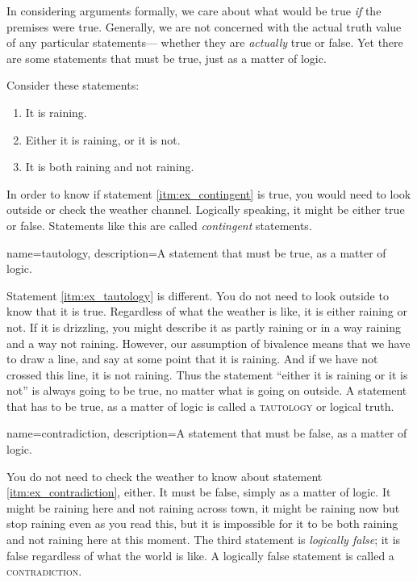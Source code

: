 In considering arguments formally, we care about what would be true \emph{if} the premises were true. Generally, we are not concerned with the actual truth value of any particular statements--- whether they are \emph{actually} true or false. Yet there are some statements that must be true, just as a matter of logic.

Consider these statements:
\begin{enumerate}[label=(\alph*)]
\item \label{itm:ex_contingent} It is raining.
\item \label{itm:ex_tautology} Either it is raining, or it is not.
\item \label{itm:ex_contradiction} It is both raining and not raining.
\end{enumerate}
In order to know if statement \ref{itm:ex_contingent} is true, you would need to look outside or check the weather channel. Logically speaking, it might be either true or false. Statements like this are called \emph{contingent} statements.


{
name=tautology,
description={A statement that must be true, as a matter of logic.}
}

Statement \ref{itm:ex_tautology} is different. You do not need to look outside to know that it is true. Regardless of what the weather is like, it is either raining or not. If it is drizzling, you might describe it as partly raining or in a way raining and a way not raining. However, our assumption of bivalence means that we have to draw a line, and say at some point that it is raining. And if we have not crossed this line, it is not raining. Thus the statement ``either it is raining or it is not'' is always going to be true, no matter what is going on outside. A statement that has to be true, as a matter of logic is called a \textsc{\gls{tautology}} \label{def:tautology} or logical truth. 

{
name=contradiction,
description={A statement that must be false, as a matter of logic.}
}

You do not need to check the weather to know about statement \ref{itm:ex_contradiction}, either. It must be false, simply as a matter of logic. It might be raining here and not raining across town, it might be raining now but stop raining even as you read this, but it is impossible for it to be both raining and not raining here at this moment. The third statement is \emph{logically false}; it is false regardless of what the world is like. A logically false statement is called a \textsc{\gls{contradiction}}. \label{def:contradiction}

